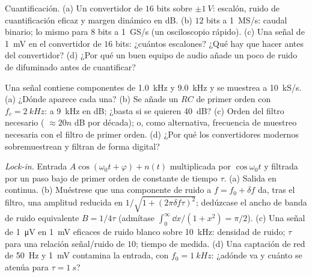 \begin{exercise}[$\star\star$]\label{exo:b2:feedback-oscillators:8}
Cuantificación. (a) Un convertidor de $16$ bits sobre $\pm\qty{1}{V}$:
escalón, ruido de cuantificación eficaz y margen dinámico en dB.
(b) $12$ bits a \qty{1}{MS/s}: caudal binario; lo mismo para $8$ bits a
\qty{1}{GS/s} (un osciloscopio rápido). (c) Una señal de \qty{1}{mV} en el
convertidor de $16$ bits: ¿cuántos escalones? ¿Qué hay que hacer antes del
convertidor? (d) ¿Por qué un buen equipo de audio añade un poco de ruido
de difuminado antes de cuantificar?
\end{exercise}

\begin{exercise}[$\star\star$]\label{exo:b2:feedback-oscillators:9}
Una señal contiene componentes de \qty{1.0}{kHz} y \qty{9.0}{kHz} y se
muestrea a \qty{10}{kS/s}. (a) ¿Dónde aparece cada una? (b) Se añade un
 $RC$ de primer orden con $f_c = \qty{2}{kHz}$:
 a \qty{9}{kHz} en dB; ¿basta si se quieren \qty{40}{dB}? (c)
Orden del filtro necesario ( $\approx 20n$ dB por década); o, como
alternativa, frecuencia de muestreo necesaria con el filtro de primer
orden. (d) ¿Por qué los convertidores modernos sobremuestrean y filtran de forma digital?
\end{exercise}

\begin{exercise}[$\star\star\star$]\label{exo:b2:feedback-oscillators:10}
\emph{Lock-in.} Entrada $A\cos(\omega_0t + \varphi) + n(t)$ multiplicada por $\cos\omega_0t$
y filtrada por un paso bajo de primer orden de constante de tiempo $\tau$.
(a) Salida en continua. (b) Muéstrese que una componente de ruido a
$f = f_0 + \delta f$ da, tras el filtro, una amplitud reducida en
$1/\sqrt{1 + (2\pi\delta f\tau)^2}$; dedúzcase el ancho de banda de ruido
equivalente $B = 1/4\tau$ (admítase $\int_0^\infty
\dd x/(1 + x^2) = \pi/2$). (c) Una señal de \qty{1}{\micro V} en \qty{1}{mV} eficaces de
ruido blanco sobre \qty{10}{kHz}: densidad de ruido; $\tau$ para una
relación señal/ruido de $10$; tiempo de medida. (d) Una captación de red de \qty{50}{Hz} y \qty{1}{mV}
contamina la entrada, con $f_0 = \qty{1}{kHz}$: ¿adónde va y cuánto se
atenúa para $\tau = \qty{1}{s}$?
\end{exercise}

